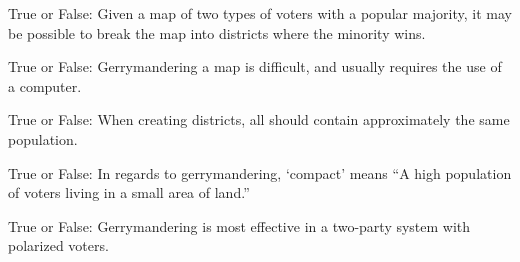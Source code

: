\documentclass[nooutcomes,noauthor]{ximera}
\author{Bart Snapp}
\begin{document}
\maketitle



\begin{exercise} True or False:
 Given a map of two types of voters with a popular majority, it may be
 possible to break the map into districts where the minority wins.
\end{exercise}

\begin{exercise} True or False:
 Gerrymandering a map is difficult, and usually requires the use of a computer. 
\end{exercise}



\begin{exercise} True or False:
 When creating districts, all should contain approximately the same population.
\end{exercise}


\begin{exercise} True or False:
 In regards to gerrymandering, `compact' means ``A high population of
 voters living in a small area of land.''
\end{exercise}


\begin{exercise} True or False:
 Gerrymandering is most effective in a two-party system with polarized voters.
\end{exercise}


\end{document}
